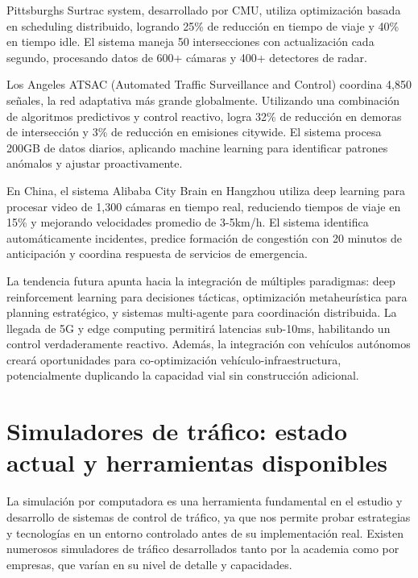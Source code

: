 \documentclass[12pt,a4paper,oneside]{report}
\begin{document}
Pittsburgh\textquotesingle s Surtrac system, desarrollado por CMU, utiliza optimización basada en scheduling distribuido, logrando 25\% de reducción en tiempo de viaje y 40\% en tiempo idle. El sistema maneja 50 intersecciones con actualización cada segundo, procesando datos de 600+ cámaras y 400+ detectores de radar.

Los Angeles ATSAC (Automated Traffic Surveillance and Control) coordina 4,850 señales, la red adaptativa más grande globalmente. Utilizando una combinación de algoritmos predictivos y control reactivo, logra 32\% de reducción en demoras de intersección y 3\% de reducción en emisiones citywide. El sistema procesa 200GB de datos diarios, aplicando machine learning para identificar patrones anómalos y ajustar proactivamente.

En China, el sistema Alibaba City Brain en Hangzhou utiliza deep learning para procesar video de 1,300 cámaras en tiempo real, reduciendo tiempos de viaje en 15\% y mejorando velocidades promedio de 3-5km/h. El sistema identifica automáticamente incidentes, predice formación de congestión con 20 minutos de anticipación y coordina respuesta de servicios de emergencia.

La tendencia futura apunta hacia la integración de múltiples paradigmas: deep reinforcement learning para decisiones tácticas, optimización metaheurística para planning estratégico, y sistemas multi-agente para coordinación distribuida. La llegada de 5G y edge computing permitirá latencias sub-10ms, habilitando un control verdaderamente reactivo. Además, la integración con vehículos autónomos creará oportunidades para co-optimización vehículo-infraestructura, potencialmente duplicando la capacidad vial sin construcción adicional.

\section{Simuladores de tráfico: estado actual y herramientas disponibles}\label{simuladores-de-truxe1fico-estado-actual-y-herramientas-disponibles}

La simulación por computadora es una herramienta fundamental en el estudio y desarrollo de sistemas de control de tráfico, ya que nos permite probar estrategias y tecnologías en un entorno controlado antes de su implementación real. Existen numerosos simuladores de tráfico desarrollados tanto por la academia como por empresas, que varían en su nivel de detalle y capacidades.
\end{document}
